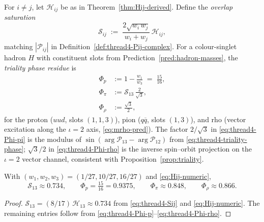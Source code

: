 \begin{definition}
\label{def:thread4-hadron-phase}
For $i\neq j$, let $\mathcal{H}_{ij}$ be as in Theorem~\ref{thm:Hij-derived}.
Define the \emph{overlap saturation}
\begin{equation}\label{eq:thread4-Sij}
  \mathcal{S}_{ij}
  \;:=\;
  \frac{2\sqrt{w_i\,w_j}}{w_i+w_j}\,
  \mathcal{H}_{ij},
\end{equation}
matching $|\mathcal{P}_{ij}|$ in Definition~\ref{def:thread4-Pij-complex}.
For a colour-singlet hadron $H$ with constituent slots from
Prediction~\ref{pred:hadron-masses}, the \emph{triality phase residue} is
\begin{align}
  \Phi_p
  &:=
  1-\frac{w_1}{w_3}
  \;=\;
  \frac{15}{16},
  \label{eq:thread4-Phi-p}\\[4pt]
  \Phi_\pi
  &:=
  \mathcal{S}_{13}\,
  \frac{2}{\sqrt{3}},
  \label{eq:thread4-Phi-pi}\\[4pt]
  \Phi_\rho
  &:=
  \frac{\sqrt{3}}{2},
  \label{eq:thread4-Phi-rho}
\end{align}
for the proton ($uud$, slots $(1,1,3)$), pion ($q\overline{q}$, slots
$(1,3)$), and rho (vector excitation along the $\iota=2$ axis,
\eqref{eq:mrho-pred}). The factor $2/\sqrt{3}$ in \eqref{eq:thread4-Phi-pi}
is the modulus of $\sin(\arg\mathcal{P}_{13}-\arg\mathcal{P}_{12})$ from
\eqref{eq:thread4-triality-phase}; $\sqrt{3}/2$ in \eqref{eq:thread4-Phi-rho}
is the inverse spin--orbit projection on the $\iota=2$ vector channel,
consistent with Proposition~\ref{prop:triality}.
\end{definition}

\begin{lemma}
\label{lem:thread4-Phi-numeric}
With $(w_1,w_2,w_3)=(1/27,10/27,16/27)$ and \eqref{eq:Hij-numeric},
\begin{equation}\label{eq:thread4-Phi-values}
  \mathcal{S}_{13}\approx 0.734,
  \qquad
  \Phi_p=\tfrac{15}{16}=0.9375,
  \qquad
  \Phi_\pi\approx 0.848,
  \qquad
  \Phi_\rho\approx 0.866.
\end{equation}
\end{lemma}

\begin{proof}
$\mathcal{S}_{13}=(8/17)\,\mathcal{H}_{13}\approx 0.734$ from
\eqref{eq:thread4-Sij} and \eqref{eq:Hij-numeric}. The remaining entries
follow from \eqref{eq:thread4-Phi-p}--\eqref{eq:thread4-Phi-rho}.
\end{proof}

